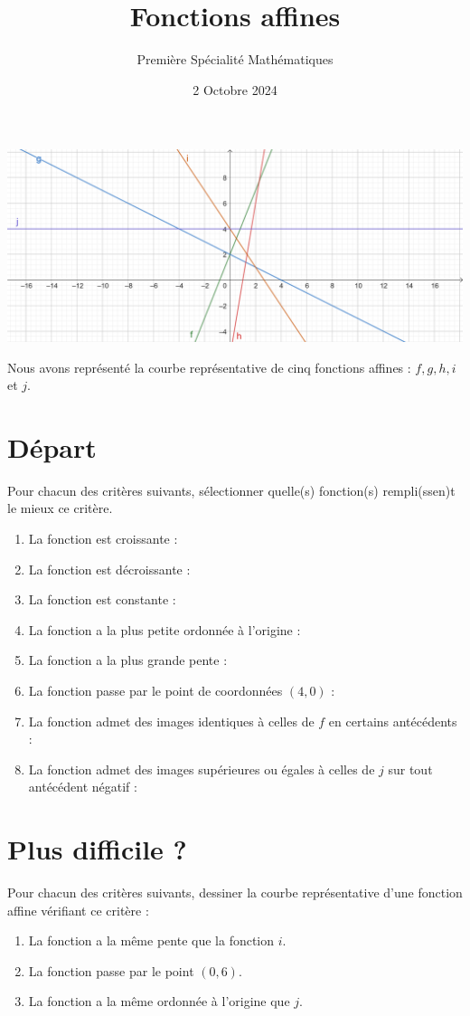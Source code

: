 \documentclass{article}
\title{Fonctions affines}
\date{2 Octobre 2024}
\author{Première Spécialité Mathématiques}
\begin{document}
\maketitle

\begin{center}
\includegraphics[width=\textwidth]{Exemples.png}
\end{center}

Nous avons représenté la courbe représentative de cinq fonctions affines : $f, g, h, i$ et $j$.

\section{Départ}
Pour chacun des critères suivants, sélectionner quelle(s) fonction(s) rempli(ssen)t le mieux ce critère.

\begin{enumerate}
\item La fonction est croissante :
\item La fonction est décroissante :
\item La fonction est constante :
\item La fonction a la plus petite ordonnée à l'origine :
\item La fonction a la plus grande pente :
\item La fonction passe par le point de coordonnées $(4,0)$ :
\item La fonction admet des images identiques à celles de $f$ en certains antécédents :
\item La fonction admet des images supérieures ou égales à celles de $j$ sur tout antécédent négatif :
\end{enumerate}

\section{Plus difficile ?}
Pour chacun des critères suivants, dessiner la courbe représentative d'une fonction affine vérifiant ce critère :
\begin{enumerate}
\item La fonction a la même pente que la fonction $i$.
\item La fonction passe par le point $(0,6)$.
\item La fonction a la même ordonnée à l'origine que $j$. 
\end{enumerate}
\end{document}
